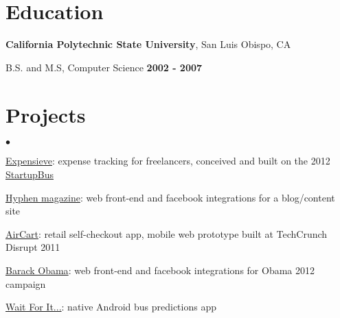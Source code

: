 \documentclass[margin,line]{res}
\newenvironment{list1}{
  \begin{list}{\ding{113}}{%
      \setlength{\itemsep}{0in}
      \setlength{\parsep}{0in} \setlength{\parskip}{0in}
      \setlength{\topsep}{0in} \setlength{\partopsep}{0in} 
      \setlength{\leftmargin}{0.17in}}}{\end{list}}
\newenvironment{list2}{
  \begin{list}{$\bullet$}{%
      \setlength{\itemsep}{0in}
      \setlength{\parsep}{0in} \setlength{\parskip}{0in}
      \setlength{\topsep}{0in} \setlength{\partopsep}{0in} 
      \setlength{\leftmargin}{0.2in}}}{\end{list}}
\begin{document}
\begin{resume}
\section{\sc \large Education}
{\bf California Polytechnic State University}, San Luis Obispo, CA\\
\vspace*{-.1in}
\begin{list1}
\item[] B.S. and M.S, Computer Science \hfill {\small \bf 2002 - 2007}
\end{list1}

\section{\sc \large Projects} 
\begin{list2}
\item \href{http://www.expensieve.com}{Expensieve}: expense tracking for freelancers, conceived and built on the 2012 \href{http://startupbus.com/americas/}{StartupBus}
\item \href{http://www.hyphenmagazine.com}{Hyphen magazine}: web front-end and facebook integrations for a blog/content site
\item \href{http://aircartapp.com/}{AirCart}: retail self-checkout app, mobile web prototype built at TechCrunch Disrupt 2011
\item \href{http://www.barackobama.com/}{Barack Obama}: web front-end and facebook integrations for Obama 2012 campaign
\item \href{https://play.google.com/store/apps/details?id=com.bryanestrada.waitforit}{Wait For It...}: native Android bus predictions app\\
\end{list2}



\end{resume}
\end{document}
